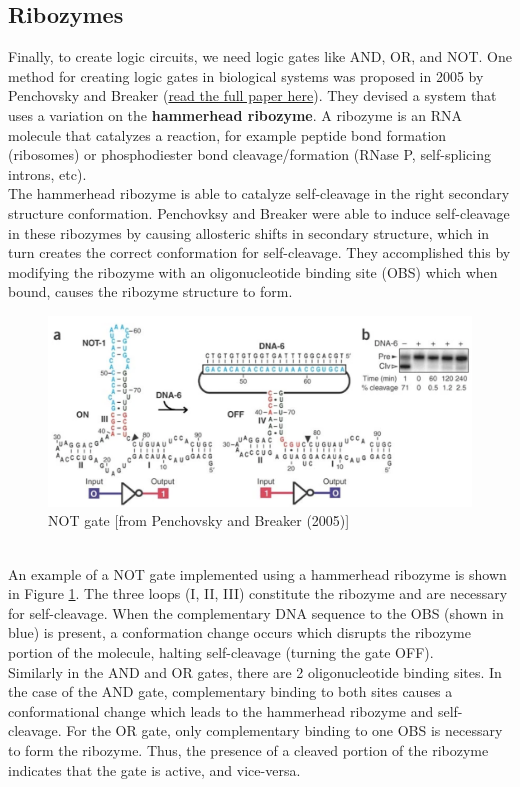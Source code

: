 \documentclass[12pt]{article}
\begin{document}
\subsection{Ribozymes}
Finally, to create logic circuits, we need logic gates like AND, OR, and NOT. One method for creating logic gates in biological systems was proposed in 2005 by Penchovsky and Breaker (\href{https://dx.doi.org/10.1038/nbt1155}{read the full paper here}). They devised a system that uses a variation on the {\bf hammerhead ribozyme}. A ribozyme is an RNA molecule that catalyzes a reaction, for example peptide bond formation (ribosomes) or phosphodiester bond cleavage/formation (RNase P, self-splicing introns, etc).\\[10pt]
The hammerhead ribozyme is able to catalyze self-cleavage in the right secondary structure conformation. Penchovksy and Breaker were able to induce self-cleavage in these ribozymes by causing allosteric shifts in secondary structure, which in turn creates the correct conformation for self-cleavage. They accomplished this by modifying the ribozyme with an oligonucleotide binding site (OBS) which when bound, causes the ribozyme structure to form.
\begin{figure}[h!]
    \centering
    \includegraphics[width =.9\linewidth]{notgate.png}
    \caption{NOT gate [from Penchovsky and Breaker (2005)]}
    \label{fig:not_gate}
\end{figure}\\
An example of a NOT gate implemented using a hammerhead ribozyme is shown in Figure \ref{fig:not_gate}. The three loops (I, II, III) constitute the ribozyme and are necessary for self-cleavage. When the complementary DNA sequence to the OBS (shown in blue) is present, a conformation change occurs which disrupts the ribozyme portion of the molecule, halting self-cleavage (turning the gate OFF).\\[10pt]
Similarly in the AND and OR gates, there are 2 oligonucleotide binding sites. In the case of the AND gate, complementary binding to both sites causes a conformational change which leads to the hammerhead ribozyme and self-cleavage. For the OR gate, only complementary binding to one OBS is necessary to form the ribozyme. Thus, the presence of a cleaved portion of the ribozyme indicates that the gate is active, and vice-versa.
\end{document}
